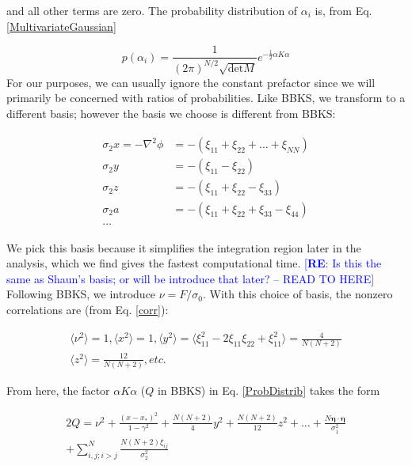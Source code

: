 \documentclass[12pt]{article}
\newcommand{\re}[1]{\textcolor{blue}{[{\bf RE}: #1]}}
\begin{document}
\noindent and all other terms are zero. The probability distribution of $\alpha_i$ is, from Eq. \ref{MultivariateGaussian}

\begin{equation} \label{ProbDistrib}
p(\alpha_i)=\frac{1}{(2\pi)^{N/2}\sqrt{\mathrm{det}M}} e^{-\frac{1}{2}\alpha K \alpha}
\end{equation}
%
For our purposes, we can usually ignore the constant prefactor since we will primarily be concerned with ratios of probabilities.  Like BBKS, we transform to a different basis; however the basis we choose is different from BBKS:

\begin{align*}
\begin{split}
\sigma_2x = -\nabla^2\phi &= -(\xi_{11}+\xi_{22}+\ldots+\xi_{NN})\\
\sigma_2y &= -(\xi_{11}-\xi_{22})\\
\sigma_2z &= -(\xi_{11}+\xi_{22}-\xi_{33})\\
\sigma_2a &= -(\xi_{11}+\xi_{22}+\xi_{33}-\xi_{44})\\
\ldots
\end{split}
\end{align*}

We pick this basis because it simplifies the integration region later in the analysis, which we find gives the fastest computational time. \re{Is this the same as Shaun's basis; or will be introduce that later?  -- READ TO HERE}  Following BBKS, we introduce $\nu = F/\sigma_0$. With this choice of basis, the nonzero correlations are (from Eq. \ref{corr}):

\begin{gather}
\langle\nu^2\rangle = 1, \langle x^2\rangle=1, \langle y^2 \rangle = \langle \xi_{11}^2 -2\xi_{11}\xi_{22} + \xi_{11}^2\rangle = \frac{4}{N(N+2)} \\
\langle z^2 \rangle = \frac{12}{N(N+2)}, etc.
\end{gather}

From here, the factor $\alpha K \alpha$ ($Q$ in BBKS) in Eq. \ref{ProbDistrib} takes the form

\begin{equation} \label{Q}
\begin{split}
2Q = \nu^2 + \frac{(x-x_*)^2}{1-\gamma^2} + \frac{N(N+2)}{4}y^2 + \frac{N(N+2)}{12}z^2 + \ldots + \frac{N \pmb{\eta}\cdot \pmb{\eta}}{\sigma_1^2} \\
+ \sum_{i,j;i > j}^N\frac{N(N+2)\xi_{ij}}{\sigma_2^2}
\end{split}
\end{equation}
\end{document}
